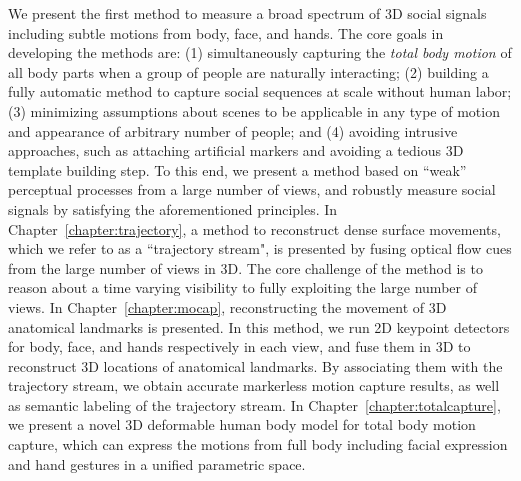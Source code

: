 We present the first method to measure a broad spectrum of 3D social signals including subtle motions from body, face, and hands. The core goals in developing the methods are: (1) simultaneously capturing the \emph{total body motion} of all body parts when a group of people are naturally interacting; (2) building a fully automatic method to capture social sequences at scale without human labor; (3) minimizing assumptions about scenes to be applicable in any type of motion and appearance of arbitrary number of people; and (4) avoiding intrusive approaches, such as attaching artificial markers and avoiding a tedious 3D template building step. To this end, we present a method based on ``weak'' perceptual processes from a large number of views, and robustly measure social signals by satisfying the aforementioned principles. In Chapter~\ref{chapter:trajectory}, a method to reconstruct dense surface movements, which we refer to as a ``trajectory stream", is presented by fusing optical flow cues from the large number of views in 3D. The core challenge of the method is to reason about a time varying visibility to fully exploiting the large number of views. In Chapter~\ref{chapter:mocap}, reconstructing the movement of 3D anatomical landmarks is presented. In this method, we run 2D keypoint detectors for body, face, and hands respectively in each view, and fuse them in 3D to reconstruct 3D locations of anatomical landmarks. By associating them with the trajectory stream, we obtain accurate markerless motion capture results, as well as semantic labeling of the trajectory stream.  In Chapter~\ref{chapter:totalcapture}, we present a novel 3D deformable human body model for total body motion capture, which can express the motions from full body including facial expression and hand gestures in a unified parametric space. 


	


